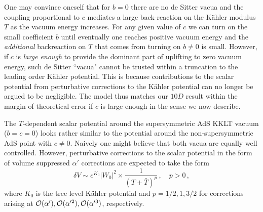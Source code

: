 \documentclass[aps,prd,amsmath,amsfonts,a4paper,11pt,reprint,twocolumn,square,numbers,showpacs,superscriptaddress,floatfix,sort&compress,nofootinbib]{revtex4-1}
\begin{document}
One may convince oneself that for $b=0$ there are no de Sitter vacua and the coupling proportional to $c$ mediates a large back-reaction on the K\"ahler modulus $T$ as the vacuum energy increases. For any given value of $c$ we can turn on the small coefficient $b$ until eventually one reaches positive vacuum energy and the \textit{additional} backreaction on $T$ that comes from turning on $b\neq 0$ is small. However, if $c$ is \textit{large enough} to provide the dominant part of uplifting to zero vacuum energy, such de Sitter ``vacua" cannot be trusted within a truncation to the leading order K\"ahler potential. This is because contributions to the scalar potential from perturbative corrections to the K\"ahler potential can no longer be argued to be negligible. The model thus matches our $10D$ result within the margin of theoretical error if $c$ is large enough in the sense we now describe.

The $T$-dependent scalar potential around the supersymmetric AdS KKLT vacuum ($b=c=0$) looks rather similar to the potential around the non-supersymmetric AdS point with $c\neq 0$. Naively one might believe that both vacua are equally well controlled. However, perturbative corrections to the scalar potential in the form of volume suppressed $\alpha'$ corrections are expected to take the form
\begin{equation}
\delta V\sim e^{K_0}|W_0|^2\times \frac{1}{(T+\bar{T})^p}\, ,\quad p>0\, ,
\end{equation}  
where $K_0$ is the tree level K\"ahler potential and $p=1/2,1,3/2$ for corrections arising at ${\cal O}(\alpha'),{\cal O}(\alpha'^2),{\cal O}(\alpha'^3)$, respectively.
\end{document}
